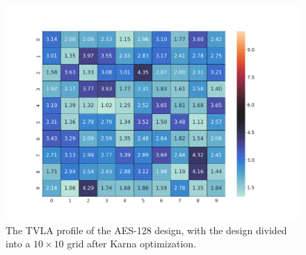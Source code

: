 \begin{figure}[t!]
\centering
  \includegraphics[scale=0.20]{Chapter4/fig/aes_final.png}  
\caption{The TVLA profile of the AES-128 design, with the design divided into a $10\times 10$ grid after {\sf Karna} optimization. }
\label{fig:aesfinal}
\vspace{-10pt}
\end{figure}










 

